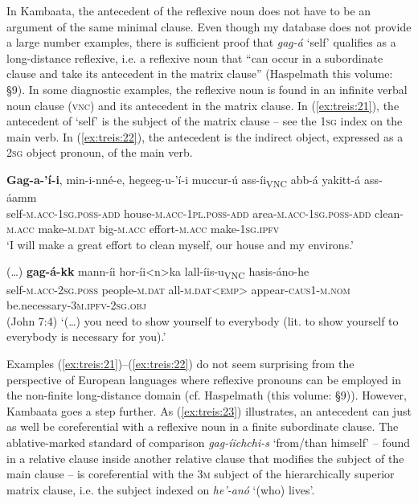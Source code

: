 \documentclass[output=paper]{langscibook}
\begin{document}
In Kambaata, the antecedent of the reflexive noun does not have to be an argument of the same minimal clause. Even though my database does not provide a large number examples, there is sufficient proof that \textit{gag-á} ‘self’ qualifies as a long-distance reflexive, i.e. a reflexive noun that “can occur in a subordinate clause and take its antecedent in the matrix clause” (Haspelmath this volume: §9). In some diagnostic examples, the reflexive noun is found in an infinite verbal noun clause (\textsc{vnc)} and its antecedent in the matrix clause. In (\ref{ex:treis:21}), the antecedent of ‘self’ is the subject of the matrix clause – see the \textsc{1sg} index on the main verb. In (\ref{ex:treis:22}), the antecedent is the indirect object, expressed as a \textsc{2sg} object pronoun, of the main verb. 

\ea\label{ex:treis:21} 
\gll {\ob}\textbf{Gag-a-’í-i}, min-i-nné-e, hegeeg-u-’í-i muccur-ú ass-íi{\cb}\textup{\textsubscript{VNC}} abb-á yakitt-á ass-áamm\\
     {\db}self-\textsc{m.acc-1sg.poss-add} house-\textsc{m.acc-1pl.poss-add} area-\textsc{m.acc-1sg.poss-add} clean-\textsc{m.acc} make-\textsc{m.dat} big-\textsc{m.acc} effort-\textsc{m.acc} make-\textsc{1sg.ipfv}\\
\glt ‘I will make a great effort to clean myself, our house and my environs.’ \citep[4.120]{KEB1989}\z

\ea\label{ex:treis:22} 
\gll {\ob}(…) \textbf{gag-á-kk} mann-íi hor-íi<n>ka lall-íis-u{\cb}\textup{\textsubscript{VNC}} hasis-áno-he\\
     {\db}{} self-\textsc{m.acc-2sg.poss} people-\textsc{m.dat} all-\textsc{m.dat<emp>} appear-\textsc{caus1-m.nom} be.necessary-\textsc{3m.ipfv-2sg.obj}\\
\glt (John 7:4) ‘(…) you need to show yourself to everybody (lit. to show yourself to everybody is necessary for you).’ \citep[32]{KHTPH2005}\z

Examples (\ref{ex:treis:21})--(\ref{ex:treis:22}) do not seem surprising from the perspective of European languages where reflexive pronouns can be employed in the non-finite long-distance domain (cf. Haspelmath (this volume: §9)). However, Kambaata goes a step further. As (\ref{ex:treis:23}) illustrates, an antecedent can just as well be coreferential with a reflexive noun in a finite subordinate clause. The ablative-marked standard of comparison \textit{gag-íichchi-s} ‘from/than himself’ – found in a relative clause inside another relative clause that modifies the subject of the main clause – is coreferential with the \textsc{3m} subject of the hierarchically superior matrix clause, i.e. the subject indexed on \textit{he’-anó} ‘(who) lives’.
\end{document}
